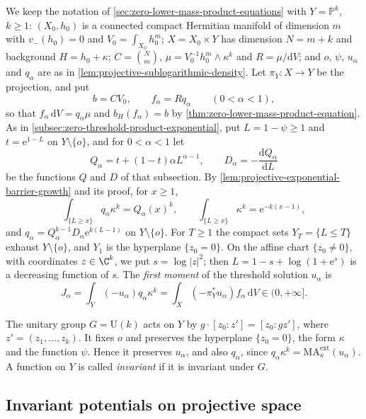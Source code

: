 We keep the notation of \cref{sec:zero-lower-mass-product-equations} with $Y=\mathbb P^k$, $k\geq1$: $(X_0,h_0)$ is a connected compact Hermitian manifold of dimension $m$ with $v_-(h_0)=0$ and $V_0=\int_{X_0}h_0^m$; $X=X_0\times Y$ has dimension $N=m+k$ and background $H=h_0+\kappa$; $C=\binom Nm$, $\mu=V_0^{-1}h_0^m\wedge\kappa^k$ and $R=\mu/\mathrm{d}V$; and $o$, $\psi$, $u_\alpha$ and $q_\alpha$ are as in \cref{lem:projective-sublogarithmic-density}. Let $\pi_Y\colon X\to Y$ be the projection, and put
\[
 b=CV_0,\qquad f_\alpha=Rq_\alpha\qquad(0<\alpha<1),
\]
so that $f_\alpha\,\mathrm{d}V=q_\alpha\mu$ and $b_H(f_\alpha)=b$ by \cref{thm:zero-lower-mass-product-equation}. As in \cref{subsec:zero-threshold-product-exponential}, put $L=1-\psi\geq1$ and $t=\mathrm{e}^{1-L}$ on $Y\setminus\{o\}$, and for $0<\alpha<1$ let
\[
 Q_\alpha=t+(1-t)\alpha L^{\alpha-1},\qquad D_\alpha=-\frac{\mathrm{d}Q_\alpha}{\mathrm{d}L}
\]
be the functions $Q$ and $D$ of that subsection. By \cref{lem:projective-exponential-barrier-growth} and its proof, for $x\geq1$,
\begin{equation}\label{eq:nonlp-selection-radial-data}
 \int_{\{L\geq x\}}q_\alpha\kappa^k=Q_\alpha(x)^k,\qquad
 \int_{\{L\geq x\}}\kappa^k=\mathrm{e}^{-k(x-1)},
\end{equation}
and $q_\alpha=Q_\alpha^{k-1}D_\alpha\mathrm{e}^{k(L-1)}$ on $Y\setminus\{o\}$. For $T\geq1$ the compact sets $Y_T=\{L\leq T\}$ exhaust $Y\setminus\{o\}$, and $Y_1$ is the hyperplane $\{z_0=0\}$. On the affine chart $\{z_0\neq0\}$, with coordinates $z\in\C^k$, we put $s=\log|z|^2$; then $L=1-s+\log(1+\mathrm{e}^s)$ is a decreasing function of $s$. The \emph{first moment} of the threshold solution $u_\alpha$ is
\begin{equation}\label{eq:nonlp-selection-moment}
 J_\alpha=\int_Y(-u_\alpha)q_\alpha\kappa^k
         =\int_X(-\pi_Y^*u_\alpha)f_\alpha\,\mathrm{d}V\in(0,+\infty].
\end{equation}

The unitary group $G=\mathrm U(k)$ acts on $Y$ by $g\cdot[z_0:z']=[z_0:gz']$, where $z'=(z_1,\ldots,z_k)$. It fixes $o$ and preserves the hyperplane $\{z_0=0\}$, the form $\kappa$ and the function $\psi$. Hence it preserves $u_\alpha$, and also $q_\alpha$, since $q_\alpha\kappa^k=\mathrm{MA}^{\mathrm{ext}}_\kappa(u_\alpha)$. A function on $Y$ is called \emph{invariant} if it is invariant under $G$.

\subsection{Invariant potentials on projective space}

